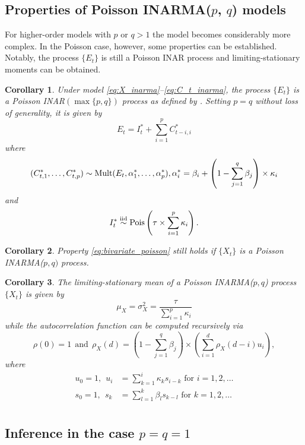 \documentclass{article}
\newtheorem{corollary}{Corollary}
\begin{document}
\subsection{Properties of Poisson INARMA($p$, $q$) models}

For higher-order models with $p$ or $q > 1$ the model becomes considerably more complex. In the Poisson case, however, some properties can be established. Notably, the process $\{E_t\}$ is still a Poisson INAR process and limiting-stationary moments can be obtained.

\begin{corollary}
Under model \eqref{eq:X_inarma}--\eqref{eq:C_t_inarma}, the process $\{E_t\}$ is a Poisson INAR$(\max\{p, q\})$ process as defined by \cite{Alzaid1990}. Setting $p = q$ without loss of generality, it is given by
$$
E_t = I^*_t + \sum_{i = 1}^p C^*_{t - i, i}
$$
where
$$
(C^*_{t, 1}, \dots, C^*_{t, p}) \sim \textnormal{Mult}(E_t, \alpha^*_1, \dots, \alpha^*_p), \alpha^*_i = \beta_i + \left(1 - \sum_{j = 1}^q \beta_j\right) \times \kappa_i
$$
and
$$
I^*_t \stackrel{\textnormal{iid}}{\sim} \textnormal{Pois}\left(\tau \times \sum_{i = 1}^p \kappa_i\right).
$$
\end{corollary}

\begin{corollary}
Property \eqref{eq:bivariate_poisson} still holds if $\{X_t\}$ is a Poisson INARMA($p, q)$ process.
\end{corollary}

\begin{corollary}
The limiting-stationary mean of a Poisson INARMA($p, q$) process $\{X_t\}$ is given by
$$
\mu_X = \sigma^2_X = \frac{\tau}{\sum_{i = 1}^p \kappa_i}
$$
while the autocorrelation function can be computed recursively via
$$
\rho(0) = 1 \ \ \text{and} \ \ \rho_X(d) = \left(1 - \sum_{j = 1}^q \beta_j\right) \times \left(\sum_{i = 1}^d \rho_X(d - i) u_i\right),
$$
where
\begin{align*}
u_0 = 1, \ \ u_i & = \sum_{k = 1}^{i} \kappa_k s_{i - k} \text{ for } i = 1, 2, \dots \\
s_0 = 1, \ \ s_k & = \sum_{l = 1}^k \beta_l s_{k - l} \text{ for } k = 1, 2, \dots \\
\end{align*}
\end{corollary}



\subsection{Inference in the case $p = q = 1$}
\end{document}
